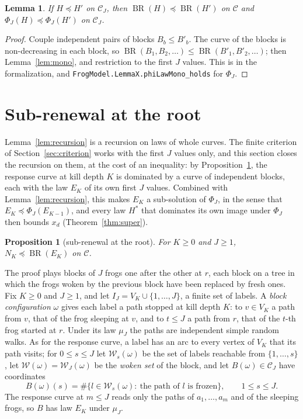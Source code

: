 \documentclass[11pt]{amsart}
\newtheorem{lemma}[theorem]{Lemma}
\newtheorem{proposition}[theorem]{Proposition}
\theoremstyle{definition}
\numberwithin{equation}{section}
\newcommand{\lean}[1]{\ignorespaces}
\newcommand{\BR}{\operatorname{BR}}
\newcommand{\cC}{\mathcal{C}}
\newcommand{\cW}{\mathcal{W}}
\newcommand{\stle}{\preceq}
\begin{document}
\begin{lemma}\label{lem:blockmono}\lean{FrogModel.LemmaX.brLawMono_holds, FrogModel.LemmaX.phiLawMono_holds, FrogModel.LemmaX.restrictMono_holds, FrogModel.Order.brCurve_mono}
If $H\stle H'$ on $\cC_J$, then $\BR(H)\stle\BR(H')$ on $\cC$ and $\Phi_J(H)\stle\Phi_J(H')$ on $\cC_J$.
\end{lemma}

\begin{proof}
Couple independent pairs of blocks $B_b\le B'_b$. The curve of the blocks is non-decreasing in each block, so $\BR(B_1,B_2,\dots)\le\BR(B'_1,B'_2,\dots)$; then Lemma~\ref{lem:mono}, and restriction to the first $J$ values. This is  in the formalization, and \texttt{FrogModel.LemmaX.phiLawMono\_holds} for $\Phi_J$.
\end{proof}

\section{Sub-renewal at the root}\label{sec:renewal}

Lemma~\ref{lem:recursion} is a recursion on laws of whole curves. The finite criterion of Section~\ref{sec:criterion} works with the first $J$ values only, and this section closes the recursion on them, at the cost of an inequality: by Proposition~\ref{prop:renewal}, the response curve at kill depth $K$ is dominated by a curve of independent blocks, each with the law $E_K$ of its own first $J$ values. Combined with Lemma~\ref{lem:recursion}, this makes $E_K$ a sub-solution of $\Phi_J$, in the sense that $E_K\stle\Phi_J(E_{K-1})$, and every law $H^*$ that dominates its own image under $\Phi_J$ then bounds $x_d$ (Theorem~\ref{thm:super}).

\begin{proposition}[sub-renewal at the root]\label{prop:renewal}\lean{FrogModel.LemmaX.claimA_holds, FrogModel.LemmaX.ClaimA}
For $K\ge0$ and $J\ge1$, $N_K\stle\BR(E_K)$ on $\cC$.
\end{proposition}

The proof plays blocks of $J$ frogs one after the other at $r$, each block on a tree in which the frogs woken by the previous block have been replaced by fresh ones. Fix $K\ge0$ and $J\ge1$, and let $I_J=V_K\cup\{1,\dots,J\}$, a finite set of labels. A \emph{block configuration} $\omega$ gives each label a path stopped at kill depth $K$: to $v\in V_K$ a path from $v$, that of the frog sleeping at $v$, and to $t\le J$ a path from $r$, that of the $t$-th frog started at $r$. Under its law $\mu_J$ the paths are independent simple random walks. As for the response curve, a label has an arc to every vertex of $V_K$ that its path visits; for $0\le s\le J$ let $\cW_s(\omega)$ be the set of labels reachable from $\{1,\dots,s\}$, let $\cW(\omega)=\cW_J(\omega)$ be the \emph{woken set} of the block, and let $B(\omega)\in\cC_J$ have coordinates
\[
B(\omega)(s)=\#\{l\in\cW_s(\omega):\ \text{the path of $l$ is frozen}\},\qquad 1\le s\le J.
\]
The response curve at $m\le J$ reads only the paths of $a_1,\dots,a_m$ and of the sleeping frogs, so $B$ has law $E_K$ under $\mu_J$.
\end{document}

